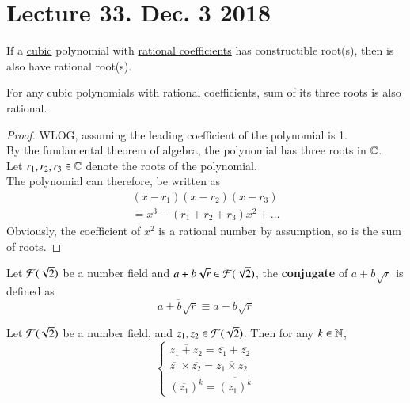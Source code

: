\documentclass[10pt]{article}
\begin{document}
		
	\section{Lecture 33. Dec. 3 2018}
	
		\begin{theorem}
			If a \ul{cubic} polynomial with \ul{rational coefficients} has constructible root(s), then is also have rational root(s).
		\end{theorem}
		
		\begin{lemma}
			For any cubic polynomials with rational coefficients, sum of its three roots is also rational.
			\begin{proof}
				WLOG, assuming the leading coefficient of the polynomial is 1. \\
				By the fundamental theorem of algebra, the polynomial has three roots in $\mathbb{C}$. \\
				Let $r_1, r_2, r_3 \in \mathbb{C}$ denote the roots of the polynomial. \\
				The polynomial can therefore, be written as 
				\begin{gather*}
					(x - r_1)(x - r_2)(x - r_3) \\
					= x^3 - (r_1 + r_2 + r_3)x^2 + \dots
				\end{gather*}
				Obviously, the coefficient of $x^2$ is a rational number by assumption, so is the sum of roots.
			\end{proof}
		\end{lemma}
		
		\begin{definition}
			Let $\mathcal{{F}}(\sqrt{2})$ be a number field and $a + b\sqrt{r} \in \mathcal{{F}}(\sqrt{2})$, the \textbf{conjugate} of $a + b\sqrt{r}$ is defined as
			\[
				\overline{a + b\sqrt{r}} \equiv a - b\sqrt{r}
			\]
		\end{definition}
		
		\begin{lemma}
			Let $\mathcal{{F}}(\sqrt{2})$ be a number field, and $z_1, z_2 \in \mathcal{{F}}(\sqrt{2})$. Then for any $k \in \mathbb{N}$,
			\[
				\begin{cases}
					\overline{z_1 + z_2} = \overline{z_1} + \overline{z_2} \\
					\overline{z_1} \times \overline{z_2} = \overline{z_1 \times z_2} \\
					(\overline{z_1})^k = \overline{(z_1)^k}
				\end{cases}
			\]
		\end{lemma}
		
\end{document}
